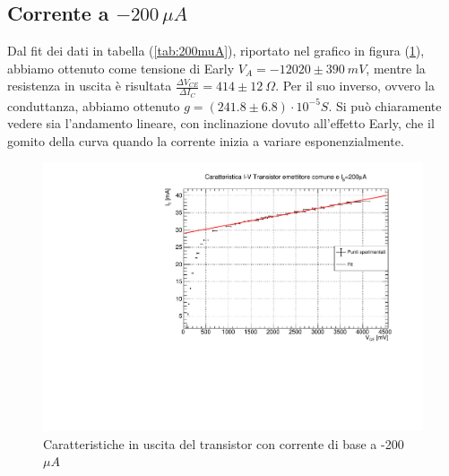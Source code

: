 \documentclass[]{article}
\begin{document}
  \subsection{Corrente a $ -200\,\mu A $}
Dal fit dei dati in tabella (\ref{tab:200muA}), riportato nel grafico in figura (\ref{fig:corrente 200}), abbiamo ottenuto come tensione di Early $ V_{A}=-12020\pm390\ mV $, mentre la resistenza in uscita è risultata $ \frac{\Delta V_{CE}}{\Delta I _{C}}=414\pm12\ \Omega$. Per il suo inverso, ovvero la conduttanza, abbiamo ottenuto $ g=(241.8\pm6.8)\cdot 10^{-5} S$. Si può chiaramente vedere sia l'andamento lineare, con inclinazione dovuto all'effetto Early, che il gomito della curva quando la corrente inizia a variare esponenzialmente.
\begin{figure}[H]
	\centering
	\includegraphics[width=0.9\linewidth]{../200 muA/c1}
	\caption{Caratteristiche in uscita del transistor con corrente di base a -200 $ \mu A $}
	\label{fig:corrente 200}
\end{figure}
\end{document}
